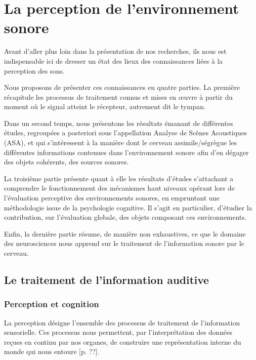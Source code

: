\chapter{La perception de l'environnement sonore}\label{ch:psycho_ea}

Avant d'aller plus loin dans la présentation de nos recherches, ils nous est indispensable ici de dresser un état des lieux des connaissances liées à la perception des sons.

Nous proposons de présenter ces connaissances en quatre parties. La première récapitule les processus de traitement connus et mises en œuvre à partir du moment où le signal atteint le récepteur, autrement dit le tympan. 

Dans un second temps, nous présentons les résultats émanant de différentes études, regroupées a posteriori sous l'appellation Analyse de Scènes Acoustiques (ASA), et qui s'intéressent à la manière dont le cerveau assimile/ségrègue  les différentes informations contenues dans l'environnement sonore afin d'en dégager des objets cohérents, \ie des sources sonores. 

La troisième partie présente quant à elle les résultats d'études s'attachant a comprendre le fonctionnement  des mécanismes haut niveaux opérant lors de l'évaluation perceptive des environnements sonores, en empruntant une méthodologie issue de la psychologie cognitive. Il s'agit en particulier, d'étudier la contribution, sur l'évaluation globale, des objets composant ces environnements.

Enfin, la dernière partie résume, de manière non exhaustives, ce que le domaine des neurosciences nous apprend sur le traitement de l'information sonore par le cerveau. 

\section{Le traitement de l'information auditive}

\subsection{Perception et cognition}

La perception désigne l'ensemble des processus de traitement de l'information sensorielle. Ces processus nous permettent, par l'interprétation des données reçues en continu par nos organes, de construire une représentation interne du monde qui nous entoure [p. ??]\citep{Houix03f}.

